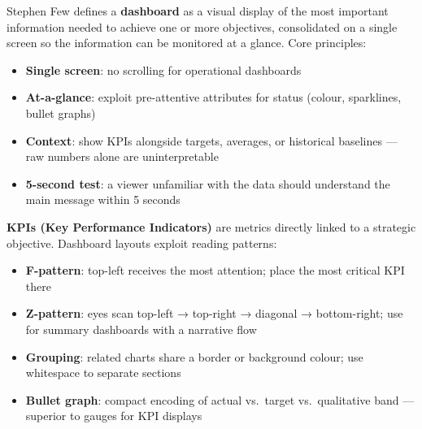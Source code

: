 \begin{tcbitemize}[ skin=sectionraster ]
    \tcbitem[title={Few's Dashboard Design Principles}, raster multicolumn=3]
    Stephen Few defines a \textbf{dashboard} as a visual display of the most important
    information needed to achieve one or more objectives, consolidated on a single screen
    so the information can be monitored at a glance.
    Core principles:
    \begin{itemize}
        \item \textbf{Single screen}: no scrolling for operational dashboards
        \item \textbf{At-a-glance}: exploit pre-attentive attributes for status (colour,
              sparklines, bullet graphs)
        \item \textbf{Context}: show KPIs alongside targets, averages, or historical
              baselines --- raw numbers alone are uninterpretable
        \item \textbf{5-second test}: a viewer unfamiliar with the data should understand
              the main message within 5 seconds
    \end{itemize}

    \tcbitem[title={KPIs and Layout Patterns}, raster multicolumn=3]
    \textbf{KPIs (Key Performance Indicators)} are metrics directly linked to a strategic
    objective. Dashboard layouts exploit reading patterns:
    \begin{itemize}
        \item \textbf{F-pattern}: top-left receives the most attention; place the most
              critical KPI there
        \item \textbf{Z-pattern}: eyes scan top-left → top-right → diagonal → bottom-right;
              use for summary dashboards with a narrative flow
        \item \textbf{Grouping}: related charts share a border or background colour;
              use whitespace to separate sections
        \item \textbf{Bullet graph}: compact encoding of actual vs.\ target vs.\
              qualitative band --- superior to gauges for KPI displays
    \end{itemize}


\end{tcbitemize}
